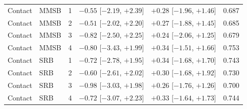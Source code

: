 \begin{tabular}{lllllr}
Contact & MMSB & 1 & $-0.55$ [$-2.19$, $+2.39$] & $+0.28$ [$-1.96$, $+1.46$] & 0.687 \\
Contact & MMSB & 2 & $-0.51$ [$-2.02$, $+2.20$] & $+0.27$ [$-1.88$, $+1.45$] & 0.685 \\
Contact & MMSB & 3 & $-0.82$ [$-2.50$, $+2.25$] & $+0.24$ [$-2.06$, $+1.25$] & 0.679 \\
Contact & MMSB & 4 & $-0.80$ [$-3.43$, $+1.99$] & $+0.34$ [$-1.51$, $+1.66$] & 0.753 \\
Contact & SRB & 1 & $-0.72$ [$-2.78$, $+1.95$] & $+0.34$ [$-1.68$, $+1.70$] & 0.743 \\
Contact & SRB & 2 & $-0.60$ [$-2.61$, $+2.02$] & $+0.30$ [$-1.68$, $+1.92$] & 0.730 \\
Contact & SRB & 3 & $-0.98$ [$-3.03$, $+1.98$] & $+0.26$ [$-1.76$, $+1.26$] & 0.700 \\
Contact & SRB & 4 & $-0.72$ [$-3.07$, $+2.23$] & $+0.33$ [$-1.64$, $+1.73$] & 0.744 \\
\bottomrule
\end{tabular}
